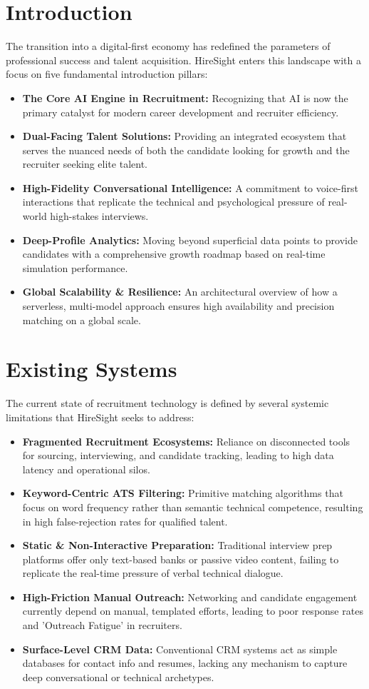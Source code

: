 \documentclass[12pt]{article}
\begin{document}
\section{Introduction}
The transition into a digital-first economy has redefined the parameters of professional success and talent acquisition. HireSight enters this landscape with a focus on five fundamental introduction pillars:
\begin{itemize}
    \item \textbf{The Core AI Engine in Recruitment:} Recognizing that AI is now the primary catalyst for modern career development and recruiter efficiency.
    \item \textbf{Dual-Facing Talent Solutions:} Providing an integrated ecosystem that serves the nuanced needs of both the candidate looking for growth and the recruiter seeking elite talent.
    \item \textbf{High-Fidelity Conversational Intelligence:} A commitment to voice-first interactions that replicate the technical and psychological pressure of real-world high-stakes interviews.
    \item \textbf{Deep-Profile Analytics:} Moving beyond superficial data points to provide candidates with a comprehensive growth roadmap based on real-time simulation performance.
    \item \textbf{Global Scalability \& Resilience:} An architectural overview of how a serverless, multi-model approach ensures high availability and precision matching on a global scale.
\end{itemize}

\section{Existing Systems}
The current state of recruitment technology is defined by several systemic limitations that HireSight seeks to address:
\begin{itemize}
    \item \textbf{Fragmented Recruitment Ecosystems:} Reliance on disconnected tools for sourcing, interviewing, and candidate tracking, leading to high data latency and operational silos.
    \item \textbf{Keyword-Centric ATS Filtering:} Primitive matching algorithms that focus on word frequency rather than semantic technical competence, resulting in high false-rejection rates for qualified talent.
    \item \textbf{Static \& Non-Interactive Preparation:} Traditional interview prep platforms offer only text-based banks or passive video content, failing to replicate the real-time pressure of verbal technical dialogue.
    \item \textbf{High-Friction Manual Outreach:} Networking and candidate engagement currently depend on manual, templated efforts, leading to poor response rates and 'Outreach Fatigue' in recruiters.
    \item \textbf{Surface-Level CRM Data:} Conventional CRM systems act as simple databases for contact info and resumes, lacking any mechanism to capture deep conversational or technical archetypes.
\end{itemize}
\end{document}

